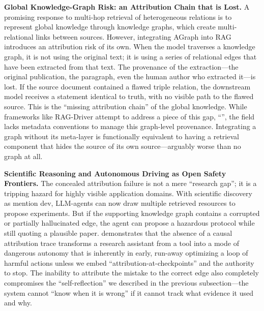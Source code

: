 \documentclass[11pt]{article}
\begin{document}
\textbf{Global Knowledge-Graph Risk: an Attribution Chain that is Lost.} A promising response to multi-hop retrieval of heterogeneous relations is to represent global knowledge through knowledge graphs, which create multi-relational links between sources. However, integrating AGraph into RAG introduces an attribution risk of its own. When the model traverses a knowledge graph, it is not using the original text; it is using a series of relational edges that have been extracted from that text. The provenance of the extraction---the original publication, the paragraph, even the human author who extracted it---is lost. If the source document contained a flawed triple relation, the downstream model receives a statement identical to truth, with no visible path to the flawed source. This is the ``missing attribution chain'' of the global knowledge. While frameworks like RAG-Driver attempt to address a piece of this gap, ``\cite{ref206}'', the field lacks metadata conventions to manage this graph-level provenance. Integrating a graph without its meta-layer is functionally equivalent to having a retrieval component that hides the source of its own source---arguably worse than no graph at all.

\textbf{Scientific Reasoning and Autonomous Driving as Open Safety Frontiers.} The concealed attribution failure is not a mere ``research gap''; it is a tripping hazard for highly visible application domains. With scientific discovery as mention dev, LLM-agents can now draw multiple retrieved resources to propose experiments. But if the supporting knowledge graph contains a corrupted or partially hallucinated edge, the agent can propose a hazardous protocol while still quoting a plausible paper. \cite{ref258} \cite{ref258} demonstrates that the absence of a causal attribution trace transforms a research assistant from a tool into a mode of dangerous autonomy that is inherently in early, run-away optimizing a loop of harmful actions unless we embed ``attribution-at-checkpoints'' and the authority to stop. The inability to attribute the mistake to the correct edge also completely compromises the ``self-reflection'' we described in the previous subsection---the system cannot ``know when it is wrong'' if it cannot track what evidence it used and why.
\end{document}
